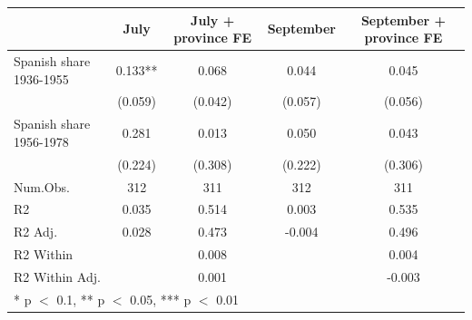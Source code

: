 \begin{table}
\centering
\begin{tabular}[t]{lcccc}
\toprule
  & July & July + province FE & September & September + province FE\\
\midrule
Spanish share 1936-1955 & 0.133** & 0.068 & 0.044 & 0.045\\
 & (0.059) & (0.042) & (0.057) & (0.056)\\
Spanish share 1956-1978 & 0.281 & 0.013 & 0.050 & 0.043\\
 & (0.224) & (0.308) & (0.222) & (0.306)\\
\midrule
Num.Obs. & 312 & 311 & 312 & 311\\
R2 & 0.035 & 0.514 & 0.003 & 0.535\\
R2 Adj. & 0.028 & 0.473 & -0.004 & 0.496\\
R2 Within &  & 0.008 &  & 0.004\\
R2 Within Adj. &  & 0.001 &  & -0.003\\
\bottomrule
\multicolumn{5}{l}{\rule{0pt}{1em}* p $<$ 0.1, ** p $<$ 0.05, *** p $<$ 0.01}\\
\end{tabular}
\end{table}
